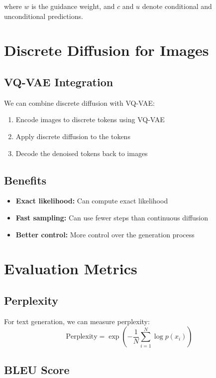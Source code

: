 where $w$ is the guidance weight, and $c$ and $u$ denote conditional and unconditional predictions.

\section{Discrete Diffusion for Images}

\subsection{VQ-VAE Integration}

We can combine discrete diffusion with VQ-VAE:
\begin{enumerate}
    \item Encode images to discrete tokens using VQ-VAE
    \item Apply discrete diffusion to the tokens
    \item Decode the denoised tokens back to images
\end{enumerate}

\subsection{Benefits}

\begin{itemize}
    \item \textbf{Exact likelihood:} Can compute exact likelihood
    \item \textbf{Fast sampling:} Can use fewer steps than continuous diffusion
    \item \textbf{Better control:} More control over the generation process
\end{itemize}

\section{Evaluation Metrics}

\subsection{Perplexity}

For text generation, we can measure perplexity:
\begin{equation}
    \text{Perplexity} = \exp\left(-\frac{1}{N} \sum_{i=1}^N \log p(x_i)\right)
\end{equation}

\subsection{BLEU Score}

